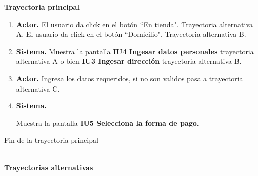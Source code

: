 \noindent \textbf{Trayectoria principal}

\begin{enumerate}
	\item {\textbf{Actor.}} El usuario da click en el botón ``En tienda". \hypertarget{CU4:TAB}{Trayectoria alternativa A.}\newline
	El usuario da click en el botón ``Domicilio". \hypertarget{CU4:TAB}{Trayectoria alternativa B.} 
	\item \textbf{Sistema.} Muestra la pantalla \textbf{IU4 Ingesar datos personales} trayectoria alternativa A o bien \textbf{IU3 Ingesar dirección} trayectoria alternativa B.
	\item \textbf{Actor.} Ingresa los datos requeridos, si no son validos pasa a trayectoria alternativa C.
	\item \hypertarget{CU1:TP:P4}{\textbf{Sistema.}} Muestra la pantalla  \textbf{IU5 Selecciona la forma de pago}.
	
\end{enumerate}

Fin de la trayectoria principal

\noindent \textbf{\\Trayectorias alternativas}

